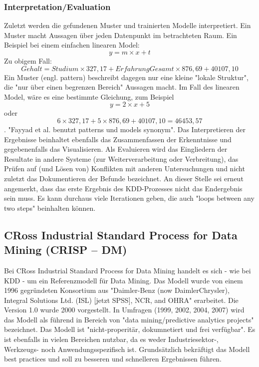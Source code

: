 \subsubsection{Interpretation/Evaluation}
Zuletzt werden die gefundenen Muster und trainierten Modelle interpretiert. Ein Muster macht Aussagen über jeden Datenpunkt im betrachteten Raum. Ein Beispiel bei einem einfachen linearen Model: $$y = m \times x + t$$
Zu obigem Fall: $$Gehalt = Studium \times 327,17 + ErfahrungGesamt \times 876,69 + 40107,10$$ Ein Muster (engl. pattern) beschreibt dagegen nur eine kleine "lokale Struktur", die "nur über einen begrenzen Bereich" Aussagen macht.\citep[S.~71; eigene Übersetzung]{swamynathan_mastering_2017} Im Fall des linearen Model, wäre es eine bestimmte Gleichung, zum Beispiel $$y = 2 \times x + 5$$ oder $$ 6 \times 327,17 + 5 \times 876,69 + 40107,10 =  46453,57$$\citep{kraker_towards_2013}. "Fayyad et al. benutzt patterns und models synonym".\citep{kraker_towards_2013}\newline
Das Interpretieren der Ergebnisse beinhaltet ebenfalls das Zusammenfassen der Erkenntnisse und gegebenenfalls das Visualisieren.\citep[S.~71]{swamynathan_mastering_2017} Als Evaluieren wird das Eingliedern der Resultate in andere Systeme (zur Weiterverarbeitung oder Verbreitung), das Prüfen auf (und Lösen von) Konflikten mit anderen Untersuchungen und nicht zuletzt das Dokumentieren der Befunde bezeichnet.\citep[S.~42]{fayyad_data_1996} \newline
{}
An dieser Stelle sei erneut angemerkt, dass das erste Ergebnis des KDD-Prozesses nicht das Endergebnis sein muss. Es kann durchaus viele Iterationen geben, die auch "loops between any two steps" beinhalten können.\citep[S.~42]{fayyad_data_1996}




\subsection{CRoss Industrial Standard Process for Data Mining (CRISP – DM)}
Bei CRoss Industrial Standard Process for Data Mining handelt es sich - wie bei KDD - um ein Referenzmodell für Data Mining. Das Modell wurde von einem 1996 gegründeten Konsortium aus "Daimler-Benz (now DaimlerChrysler), Integral Solutions Ltd. (ISL) [jetzt SPSS], NCR, and OHRA"\citep[S.~13]{shearer_crisp-dm_2000} erarbeitet. Die Version 1.0 wurde 2000 vorgestellt.\citep[S.~13]{shearer_crisp-dm_2000} In Umfragen (1999, 2002, 2004, 2007) wird das Modell als führend in Bereich von "data mining/predictive analytics projects"\citep[S.~72]{swamynathan_mastering_2017} bezeichnet. Das Modell ist "nicht-properitär, dokumnetiert und frei verfügbar"\citep[S.~13; eigene Übersetzung]{shearer_crisp-dm_2000}. Es ist ebenfalls in vielen Bereichen nutzbar, da es weder Industriesektor-, Werkzeugs- noch Anwendungsspezifisch ist. Grundsätzlich bekräftigt das Modell best practices und soll zu besseren und schnelleren Ergebnissen führen.\citep[S.~13; eigene Übersetzung]{shearer_crisp-dm_2000} \newline 


